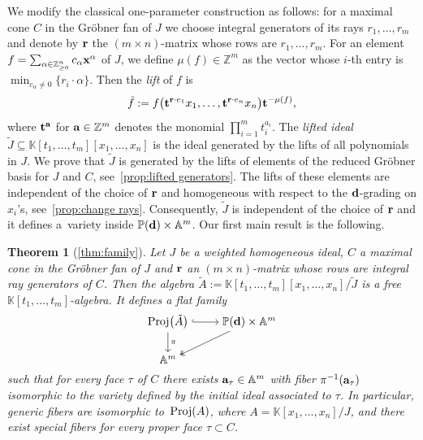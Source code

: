 \documentclass[10pt,a4paper]{amsart}
\newcommand{\thref}[1]{\ref{#1}}
\newtheorem{Theorem}{Theorem}[section]
\numberwithin{equation}{section}
\begin{document}
We modify the classical one-parameter construction as follows: for a maximal cone $C$ in the Gr\"obner fan of $J$ we choose integral generators of its rays $r_1,\dots,r_m$ and denote by ${\bf r}$ the $(m\times n)$-matrix whose rows are $r_1,\dots,r_m$.
For an element $f=\sum_{\alpha\in \mathbb Z_{\ge 0}^n} c_\alpha{\bf x}^\alpha$ of $J$,
we define $\mu(f)\in \mathbb Z^m$ as the vector whose $i$-th entry is $\min_{c_\alpha\not=0}\{r_i\cdot\alpha\}$.
Then the {\it lift} of $f$ is
\begin{displaymath}
 \tilde f:=f\big({\bf t}^{{\bf r}\cdot e_1}x_1,\dots, {\bf t}^{{\bf r}\cdot e_n}x_n\big) {\bf t}^{-\mu(f)},
\end{displaymath}
where ${\bf t}^{\bf a}$ for ${\bf a}\in \mathbb Z^m$ denotes the monomial $\prod_{i=1}^mt_i^{a_i}$.
The {\it lifted ideal} $\tilde J \subseteq \mathbb K[t_1,\dots,t_m][x_1,\dots,x_n]$ is the ideal generated by the lifts of all polynomials in $J$.
We prove that $\tilde J$ is generated by the lifts of elements of the reduced Gr\"obner basis for $J$ and $C$, see~\thref{prop:lifted generators}.
The lifts of these elements are independent of the choice of ${\bf r}$ and homogeneous with respect to the ${\bf d}$-grading on $x_i$'s, see~\thref{prop:change rays}.
Consequently, $\tilde J$ is independent of the choice of ${\bf r}$ and it defines a~variety inside $\mathbb P({\bf d})\times \mathbb A^m$. Our first main result is the following.

\begin{Theorem}[\thref{thm:family}]
Let $J$ be a weighted homogeneous ideal, $C$ a maximal cone in the Gr\"obner fan of $J$ and ${\bf r}$ an $(m\times n)$-matrix whose rows are integral ray generators of $C$.
Then the algebra $\tilde A:=\mathbb K[t_1,\dots,t_m][x_1,\dots,x_n]/\tilde J$ is a free $\mathbb K[t_1,\dots,t_m]$-algebra.
It defines a flat family
 \begin{displaymath}
 \begin{tikzcd}[ampersand replacement=\&,cramped]
 {\rm Proj}\big(\tilde A\big) \ar[r,hook]\ar[d,"\pi"] \& \mathbb P({\bf d})\times \mathbb A^m \ar[ld,twoheadrightarrow]\\
 \mathbb A^m \&
 \end{tikzcd}
 \end{displaymath}
 such that for every face $\tau$ of $C$ there exists ${\bf a}_\tau\in \mathbb A^m$ with fiber
 $\pi^{-1}({\bf a}_\tau)$ isomorphic to the variety defined by the initial ideal associated to $\tau$.
 In particular, generic fibers are isomorphic to~${\rm Proj}(A)$, where $A= \mathbb{K}[x_1, \dots , x_n]/J$, and there exist special fibers for every proper face $\tau\subset C$.
\end{Theorem}
\end{document}
